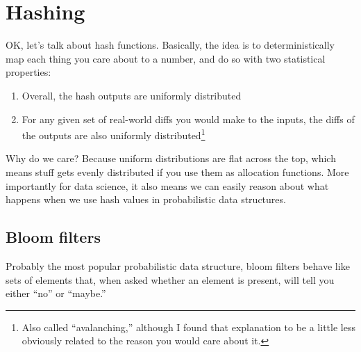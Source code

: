 \section{Hashing}
OK, let's talk about hash functions. Basically, the idea is to deterministically
map each thing you care about to a number, and do so with two statistical
properties:

\begin{enumerate}
  \item Overall, the hash outputs are uniformly distributed
  \item For any given set of real-world diffs you would make to the inputs, the
        diffs of the outputs are also uniformly distributed\footnote{Also called
        ``avalanching,'' although I found that explanation to be a little less
        obviously related to the reason you would care about it.}
\end{enumerate}

Why do we care? Because uniform distributions are flat across the top, which
means stuff gets evenly distributed if you use them as allocation functions.
More importantly for data science, it also means we can easily reason about what
happens when we use hash values in probabilistic data structures.

\subsection{Bloom filters}
Probably the most popular probabilistic data structure, bloom filters behave
like sets of elements that, when asked whether an element is present, will tell
you either ``no'' or ``maybe.''
